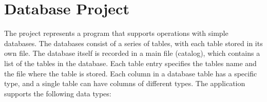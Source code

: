 \chapter{Database Project}
\hypertarget{index}{}\label{index}
\label{index_md__2_users_2krasimirkargov_2_documents_2_database_project_2_r_e_a_d_m_e}%
%
 The project represents a program that supports operations with simple databases. The databases consist of a series of tables, with each table stored in its own file. The database itself is recorded in a main file (catalog), which contains a list of the tables in the database. Each table entry specifies the table\textquotesingle{}s name and the file where the table is stored. Each column in a database table has a specific type, and a single table can have columns of different types. The application supports the following data types\+:
